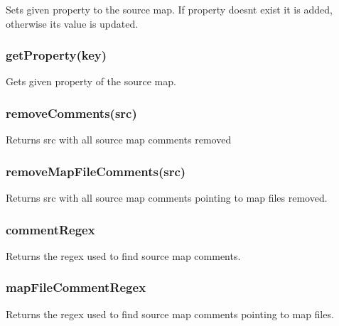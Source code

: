 Sets given property to the source map. If property doesn\textquotesingle{}t exist it is added, otherwise its value is updated.

\subsubsection*{get\+Property(key)}

Gets given property of the source map.

\subsubsection*{remove\+Comments(src)}

Returns {\ttfamily src} with all source map comments removed

\subsubsection*{remove\+Map\+File\+Comments(src)}

Returns {\ttfamily src} with all source map comments pointing to map files removed.

\subsubsection*{comment\+Regex}

Returns the regex used to find source map comments.

\subsubsection*{map\+File\+Comment\+Regex}

Returns the regex used to find source map comments pointing to map files.

\href{https://bitdeli.com/free}{\tt } 